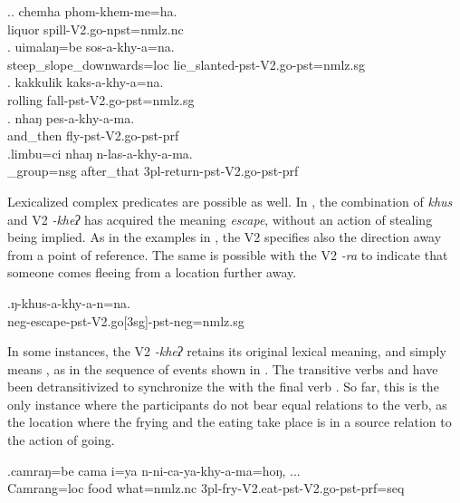 	\ex.\ag. chemha phom-khem-me=ha.\\
	liquor spill{\sc [3sg]-V2.go-npst=nmlz.nc}\\
	\bg.  uimalaŋ=be sos-a-khy-a=na.\\
	 steep\_slope\_downwards{\sc =loc} lie\_slanted{\sc [3sg]-pst-V2.go-pst=nmlz.sg}\\
		\bg. kakkulik kaks-a-khy-a=na.\\
	rolling fall{\sc [3sg]-pst-V2.go-pst=nmlz.sg}\\
	\bg. nhaŋ    pes-a-khy-a-ma.\\
	and\_then fly{\sc [3sg]-pst-V2.go-pst-prf}\\
	  
\bg.limbu=ci            nhaŋ    n-las-a-khy-a-ma.\\
\_group{\sc =nsg} after\_that {\sc 3pl-}return{\sc -pst-V2.go-pst-prf}\\
 
	

Lexicalized complex predicates are possible as well. In \Next, the combination of \emph{khus}  and V2 \emph{-kheʔ}  has acquired the meaning \emph{escape}, without an action of stealing being implied. As in the examples in \Last, the V2 specifies also the direction away from a point of reference. The same is possible with the V2 \emph{-ra}  to indicate that someone comes fleeing from a location further away.

\exg.ŋ-khus-a-khy-a-n=na.\\
{\sc neg-}escape{\sc -pst-V2.go[3sg]-pst-neg=nmlz.sg}\\

In some instances, the V2 \emph{-kheʔ} retains its original lexical meaning, and simply means , as in the sequence of events shown in \Next. The transitive verbs  and  have been detransitivized to synchronize the  with the final verb . So far, this is the only instance where the participants do not bear equal relations to the verb, as the location where the frying and the eating  take place is in a source relation to the action of going. 

\exg.camraŋ=be    cama i=ya           n-ni-ca-ya-khy-a-ma=hoŋ, ...\\
Camrang{\sc =loc} food what{\sc =nmlz.nc} {\sc 3pl-}fry{\sc -V2.eat-pst-V2.go-pst-prf=seq}\\
 
